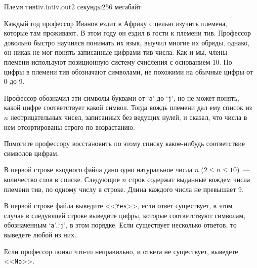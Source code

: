 \begin{problem}{Племя тив}{tiv.in}{tiv.out}{2 секунды}{256 мегабайт}


Каждый год профессор Иванов ездит в Африку с целью изучить племена, которые там проживают. В этом 
году он ездил в гости к племени тив. Профессор довольно быстро научился понимать их язык,
выучил многие их обряды, однако, он никак не мог понять записанные цифрами тив числа. 
Как и мы, члены племени используют позиционную систему счисления с основанием 10.
Но цифры в племени тив обозначают символами, не похожими на обычные цифры от 0 до 9.

Профессор обозначил эти символы буквами от `\texttt{a}' до `\texttt{j}',
но не может понять, какой цифре соответствует какой символ. Тогда вождь племени дал
ему список из $n$ неотрицательных чисел, записанных без ведущих нулей, и сказал, что 
числа в нем отсортированы строго по возрастанию.

Помогите профессору восстановить по этому списку какое-нибудь соответствие символов цифрам.

\InputFile
В первой строке входного файла дано одно натуральное числа $n$ ($2 \leq n \leq 10$)~--- количество слов в списке.
Следующие $n$ строк содержат выданные вождем числа племени тив, по одному числу в строке. Длина каждого 
числа не превышает 9.

\OutputFile
В первой строке файла выведите <<\texttt{Yes}>>, если ответ существует, в этом случае в следующей строке 
выведите цифры, которые соответствуют символам, обозначенным `\texttt{a}'..`\texttt{j}', в этом порядке. 
Если существует несколько ответов, то выведете любой из них. 

Если профессор понял что-то неправильно, и ответа не существует, выведете <<\texttt{No}>>.

\Examples                                                                                                  
\begin{example}%
%
%
\end{example}

\end{problem}
